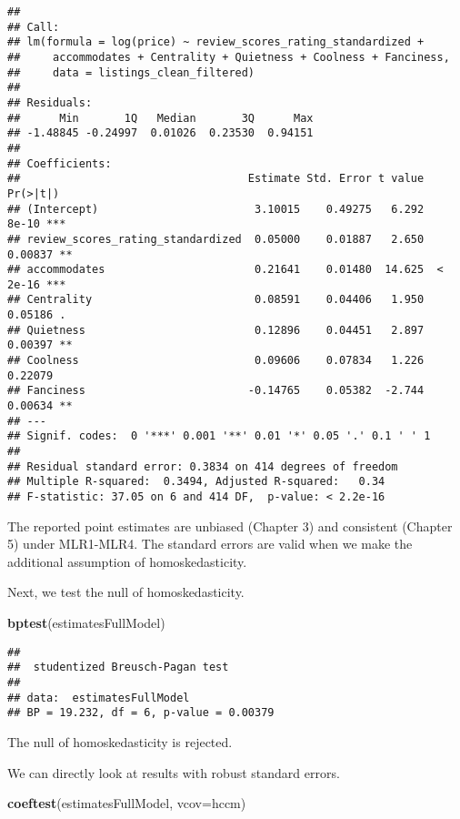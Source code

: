 \documentclass[
]{article}
\newenvironment{Shaded}{\begin{snugshade}}{\end{snugshade}}
\newcommand{\AttributeTok}[1]{\textcolor[rgb]{0.13,0.29,0.53}{#1}}
\newcommand{\FunctionTok}[1]{\textcolor[rgb]{0.13,0.29,0.53}{\textbf{#1}}}
\newcommand{\NormalTok}[1]{#1}
\begin{document}
\begin{verbatim}
## 
## Call:
## lm(formula = log(price) ~ review_scores_rating_standardized + 
##     accommodates + Centrality + Quietness + Coolness + Fanciness, 
##     data = listings_clean_filtered)
## 
## Residuals:
##      Min       1Q   Median       3Q      Max 
## -1.48845 -0.24997  0.01026  0.23530  0.94151 
## 
## Coefficients:
##                                   Estimate Std. Error t value Pr(>|t|)    
## (Intercept)                        3.10015    0.49275   6.292    8e-10 ***
## review_scores_rating_standardized  0.05000    0.01887   2.650  0.00837 ** 
## accommodates                       0.21641    0.01480  14.625  < 2e-16 ***
## Centrality                         0.08591    0.04406   1.950  0.05186 .  
## Quietness                          0.12896    0.04451   2.897  0.00397 ** 
## Coolness                           0.09606    0.07834   1.226  0.22079    
## Fanciness                         -0.14765    0.05382  -2.744  0.00634 ** 
## ---
## Signif. codes:  0 '***' 0.001 '**' 0.01 '*' 0.05 '.' 0.1 ' ' 1
## 
## Residual standard error: 0.3834 on 414 degrees of freedom
## Multiple R-squared:  0.3494, Adjusted R-squared:   0.34 
## F-statistic: 37.05 on 6 and 414 DF,  p-value: < 2.2e-16
\end{verbatim}

The reported point estimates are unbiased (Chapter 3) and consistent
(Chapter 5) under MLR1-MLR4. The standard errors are valid when we make
the additional assumption of homoskedasticity.

Next, we test the null of homoskedasticity.

\begin{Shaded}
\begin{Highlighting}[]
\FunctionTok{bptest}\NormalTok{(estimatesFullModel)}
\end{Highlighting}
\end{Shaded}

\begin{verbatim}
## 
##  studentized Breusch-Pagan test
## 
## data:  estimatesFullModel
## BP = 19.232, df = 6, p-value = 0.00379
\end{verbatim}

The null of homoskedasticity is rejected.

We can directly look at results with robust standard errors.

\begin{Shaded}
\begin{Highlighting}[]
\FunctionTok{coeftest}\NormalTok{(estimatesFullModel, }\AttributeTok{vcov=}\NormalTok{hccm)}
\end{Highlighting}
\end{Shaded}
\end{document}
